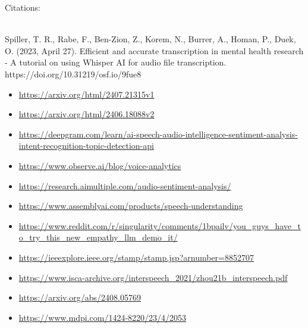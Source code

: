 \documentclass{article} %
\begin{document}
\newpage
Citations: \\ \\ 
\begin{hangparas}{15pt}{1}  %
Spiller, T. R., Rabe, F., Ben-Zion, Z., Korem, N., Burrer, A., Homan, P., Duek, O. (2023, April 27). Efficient and accurate transcription in mental health research - A tutorial on using Whisper AI for audio file transcription. https://doi.org/10.31219/osf.io/9fue8
\end{hangparas}

\begin{itemize}
    \item \url{https://arxiv.org/html/2407.21315v1}
    \item \url{https://arxiv.org/html/2406.18088v2}
    \item \url{https://deepgram.com/learn/ai-speech-audio-intelligence-sentiment-analysis-intent-recognition-topic-detection-api}
    \item \url{https://www.observe.ai/blog/voice-analytics}
    \item \url{https://research.aimultiple.com/audio-sentiment-analysis/}
    \item \url{https://www.assemblyai.com/products/speech-understanding}
    \item \url{https://www.reddit.com/r/singularity/comments/1bpailv/you_guys_have_to_try_this_new_empathy_llm_demo_it/}
    \item \url{https://ieeexplore.ieee.org/stamp/stamp.jsp?arnumber=8852707}
    \item \url{https://www.isca-archive.org/interspeech_2021/zhou21b_interspeech.pdf}
    \item \url{https://arxiv.org/abs/2408.05769}
    \item \url{https://www.mdpi.com/1424-8220/23/4/2053}
\end{itemize}
\end{document}
